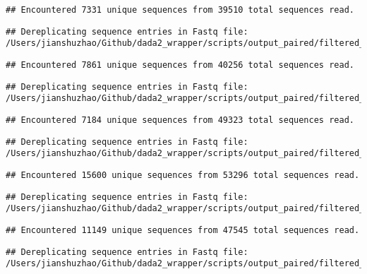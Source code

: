 \documentclass[
]{article}
\begin{document}
\begin{verbatim}
## Encountered 7331 unique sequences from 39510 total sequences read.
\end{verbatim}

\begin{verbatim}
## Dereplicating sequence entries in Fastq file: /Users/jianshuzhao/Github/dada2_wrapper/scripts/output_paired/filtered_input/Orwoll_BI0215_BI_F_filt.fastq.gz
\end{verbatim}

\begin{verbatim}
## Encountered 7861 unique sequences from 40256 total sequences read.
\end{verbatim}

\begin{verbatim}
## Dereplicating sequence entries in Fastq file: /Users/jianshuzhao/Github/dada2_wrapper/scripts/output_paired/filtered_input/Orwoll_BI0353_BI_F_filt.fastq.gz
\end{verbatim}

\begin{verbatim}
## Encountered 7184 unique sequences from 49323 total sequences read.
\end{verbatim}

\begin{verbatim}
## Dereplicating sequence entries in Fastq file: /Users/jianshuzhao/Github/dada2_wrapper/scripts/output_paired/filtered_input/Orwoll_BI0023_BI_R_filt.fastq.gz
\end{verbatim}

\begin{verbatim}
## Encountered 15600 unique sequences from 53296 total sequences read.
\end{verbatim}

\begin{verbatim}
## Dereplicating sequence entries in Fastq file: /Users/jianshuzhao/Github/dada2_wrapper/scripts/output_paired/filtered_input/Orwoll_BI0056_BI_R_filt.fastq.gz
\end{verbatim}

\begin{verbatim}
## Encountered 11149 unique sequences from 47545 total sequences read.
\end{verbatim}

\begin{verbatim}
## Dereplicating sequence entries in Fastq file: /Users/jianshuzhao/Github/dada2_wrapper/scripts/output_paired/filtered_input/Orwoll_BI0131_BI_R_filt.fastq.gz
\end{verbatim}
\end{document}
